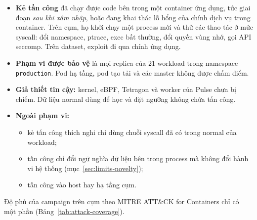 \begin{itemize}
\tightlist
\item
  \textbf{Kẻ tấn công} đã chạy được code bên trong một container ứng dụng, tức giai đoạn \emph{sau khi xâm nhập}, hoặc đang khai thác lỗ hổng của chính dịch vụ trong container. Trên cụm, họ khởi chạy một process mới và thử các thao tác ở mức syscall: đổi namespace, ptrace, exec bất thường, đổi quyền vùng nhớ, gọi API seccomp. Trên dataset, exploit đi qua chính ứng dụng.
\item
  \textbf{Phạm vi được bảo vệ} là mọi replica của 21 workload trong namespace \texttt{production}. Pod hạ tầng, pod tạo tải và các master không được chấm điểm.
\item
  \textbf{Giả thiết tin cậy:} kernel, eBPF, Tetragon và worker của Pulse chưa bị chiếm. Dữ liệu normal dùng để học và đặt ngưỡng không chứa tấn công.
\item
  \textbf{Ngoài phạm vi:}

  \begin{itemize}
  \tightlist
  \item
    kẻ tấn công thích nghi chỉ dùng chuỗi syscall đã có trong normal của workload;
  \item
    tấn công chỉ đổi ngữ nghĩa dữ liệu bên trong process mà không đổi hành vi hệ thống (mục~\ref{sec:limits-novelty});
  \item
    tấn công vào host hay hạ tầng cụm.
  \end{itemize}
\end{itemize}

Độ phủ của campaign trên cụm theo MITRE ATT\&CK for Containers chỉ có một phần (Bảng~\ref{tab:attack-coverage}).

